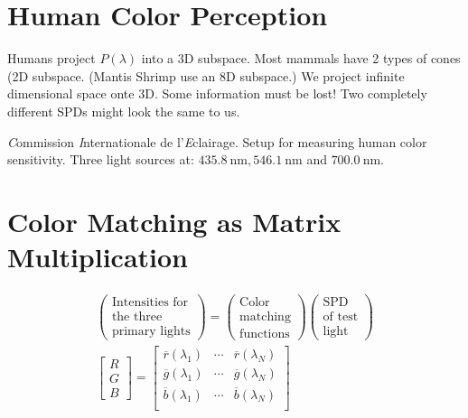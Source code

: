 \begin{compactdesc}
		\section{Human Color Perception}
		Humans project $P(\lambda)$ into a 3D subspace. Most mammals have 2 types of cones (2D subspace. (Mantis Shrimp use an 8D subspace.) We project infinite dimensional space onte 3D. Some information must be lost! Two completely different SPDs might look the same to us.
	\item[\lp{The CIE Primary System (1931)}] \emph{C}ommission \emph{I}nternationale de l'\emph{E}clairage. Setup for measuring human color sensitivity. Three light sources at: $\SI{435.8}{\nano\meter},\SI{546.1}{\nano\meter}$ and $\SI{700.0}{\nano\meter}$.
\section{Color Matching as Matrix Multiplication}
\begin{gather*}
	\!\left(\!\begin{smallmatrix}
		\text{Intensities for}\\
		\text{the three}\\
		\text{primary lights}
	\end{smallmatrix}\!\right)\!
	=
	\!\left(\!\begin{smallmatrix}
		\text{Color}\\
		\text{matching}\\
		\text{functions}
	\end{smallmatrix}\!\right)\!
	\!\left(\!\!\begin{smallmatrix}
		\text{SPD}\\
		\text{of test}\\
		\text{light}
	\end{smallmatrix}\!\!\right)\!\\
	\!\left[\!\begin{smallmatrix}
		R\\
		G\\
		B
	\end{smallmatrix}\!\right]\!\!
	=
	\!\!\left[\!\begin{smallmatrix}
		\overline{r}(\lambda_1)&\cdots&\overline{r}(\lambda_N)\\
		\overline{g}(\lambda_1)&\cdots&\overline{g}(\lambda_N)\\
		\overline{b}(\lambda_1)&\cdots&\overline{b}(\lambda_N)\\
	\end{smallmatrix}\!\right]\!\!

\end{gather*}
\end{compactdesc}
